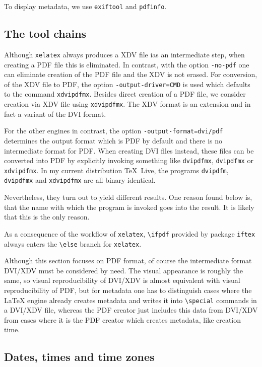 \documentclass[a4paper, english]{article}%
\newcommand{\xelatex}{\texttt{xelatex}}
\newcommand{\cmd}[1]{\texttt{\textbackslash#1}}
\newcommand{\texlive}{\TeX~Live}
\begin{document}
To display metadata, we use \texttt{exiftool} and \texttt{pdfinfo}. 


\subsection{The tool chains}\label{subsec:toolchain}

Although \xelatex{} always produces a XDV file ias an intermediate step, 
when creating a PDF file this is eliminated. 
In contrast, with the option \texttt{-no-pdf} 
one can eliminate creation of the PDF file and the XDV is not erased. 
For conversion, of the XDV file to PDF, the option \texttt{-output-driver=CMD} 
is used which defaults to the command \texttt{xdvipdfmx}. 
Besides direct creation of a PDF file, 
we consider creation via XDV file using \texttt{xdvipdfmx}. 
The XDV format is an extension and in fact a variant of the DVI format. 

For the other engines in contrast, the option \texttt{-output-format=dvi/pdf} 
determines the output format which is PDF by default 
and there is no intermediate format for PDF\@. 
When creating DVI files instead, these files can be converted into PDF 
by explicitly invoking something like 
\texttt{dvipdfmx}, \texttt{dvipdfmx} or \texttt{xdvipdfmx}. 
In my current distribution \texlive, 
the programs \texttt{dvipdfm}, \texttt{dvipdfmx} and \texttt{xdvipdfmx} 
are all binary identical. 

Nevertheless, they turn out to yield different results. 
One reason found below is, 
that the name with which the program is invoked 
goes into the result. 
It is likely that this is the only reason. 

As a consequence of the workflow of \xelatex, 
\cmd{ifpdf} provided by package \texttt{iftex} 
always enters the \cmd{else} branch for \xelatex. 

Although this section focuses on PDF format, 
of course the intermediate format DVI/XDV must be considered by need. 
The visual appearance is roughly the same, so visual reproducibility of DVI/XDV 
is almost equivalent with visual reproducibility of PDF, 
but for metadata one has to distinguish cases where the \LaTeX{} engine already creates metadata 
and writes it into \cmd{special} commands in a DVI/XDV file, 
whereas the PDF creator just includes this data from DVI/XDV 
from cases where it is the PDF creator which creates metadata, like creation time. 


\subsection{Dates, times and time zones}\label{subsec:dateTime}
\end{document}
